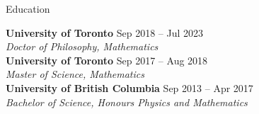 \documentclass{resume}
\begin{document}
\begin{rSection}{Education}

\textbf{University of Toronto} \hfill {\normalfont Sep 2018 -- Jul 2023} \\
{\normalfont \textit{Doctor of Philosophy, Mathematics}} \\
\textbf{University of Toronto} \hfill {\normalfont Sep 2017 -- Aug 2018} \\
{\normalfont \textit{Master of Science, Mathematics}} \\
\textbf{University of British Columbia} \hfill {\normalfont Sep 2013 -- Apr 2017}\\
{\normalfont \textit{Bachelor of Science, Honours Physics and Mathematics}}

\end{rSection}

\end{document}
